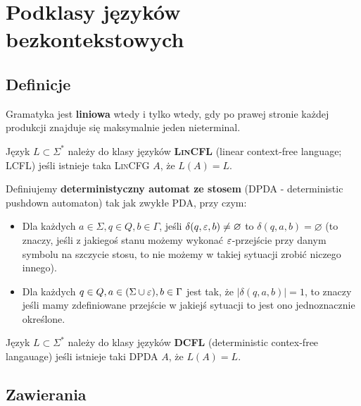 \section{Podklasy języków bezkontekstowych}
\label{cfl-subclassses}

\subsection{Definicje}

\begin{definition}
	Gramatyka jest \textbf{liniowa} wtedy i tylko wtedy, gdy po prawej stronie każdej produkcji znajduje się maksymalnie jeden nieterminal.
\end{definition}

\begin{definition}
	Język \(L \subset \Sigma^*\) należy do klasy języków \textbf{\textsc{LinCFL}} (linear context-free language; LCFL) jeśli istnieje taka \textsc{LinCFG} \(A\), że \(L(A) = L\).
\end{definition}

\begin{definition}
	Definiujemy \textbf{deterministyczny automat ze stosem} (DPDA - deterministic pushdown automaton) tak jak zwykłe PDA, przy czym:

	\begin{itemize}
		\item Dla każdych \( a \in \Sigma, q \in Q, b \in \Gamma \), jeśli \( \delta(q, \varepsilon, b) \not = \varnothing \) to \( \delta(q, a, b) = \varnothing \) (to znaczy, jeśli z jakiegoś stanu możemy wykonać \(\varepsilon\)-przejście przy danym symbolu na szczycie stosu, to nie możemy w takiej sytuacji zrobić niczego innego).
		\item Dla każdych \( q \in Q, a \in (\Sigma \cup \varepsilon) , b \in \Gamma \) jest tak, że \( |\delta(q, a, b)| = 1\), to znaczy jeśli mamy zdefiniowane przejście w jakiejś sytuacji to jest ono jednoznacznie określone.
	\end{itemize}
\end{definition}

\begin{definition}
	Język \(L \subset \Sigma^*\) należy do klasy języków \textbf{DCFL} (deterministic contex-free langauage) jeśli istnieje taki DPDA \(A\), że \(L(A) = L\).
\end{definition}

\subsection{Zawierania}

